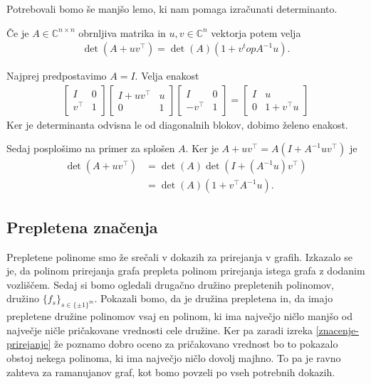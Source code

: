 Potrebovali bomo še manjšo lemo, ki nam pomaga izračunati determinanto\cite{matrix-determinant-lemma}.
\begin{lema}\label{matrix-det-lemma}
    Če je \(A\in \mathbb C^{n\times n}\) obrnljiva matrika in \(u, v \in \mathbb C^n\) vektorja potem velja
    \begin{align*}
        \det(A + uv^\top) = \det(A) (1 + v^top A^{-1} u).
    \end{align*}
\end{lema}
\begin{dokaz}
    Najprej predpostavimo \(A=I\). Velja enakost
    \begin{align*}
        \begin{bmatrix}
            I & 0 \\
            v^\top & 1
        \end{bmatrix}
        \begin{bmatrix}
            I + uv^\top & u \\
            0 & 1
        \end{bmatrix}
        \begin{bmatrix}
            I & 0 \\
            -v^\top & 1
        \end{bmatrix}
        =
        \begin{bmatrix}
            I & u \\
            0 & 1 + v^\top u
        \end{bmatrix}
    \end{align*}
    Ker je determinanta odvisna le od diagonalnih blokov, dobimo želeno enakost.

    Sedaj posplošimo na primer za splošen \(A\). Ker je \(A+uv^\top= A(I + A^{-1}uv^\top)\) je
    \begin{align*}
        \det(A + uv^\top) &= \det(A) \det(I + (A^{-1}u)v^\top)\\
         &= \det(A) (1 + v^\top A^{-1} u).
    \end{align*}
\end{dokaz}

\subsection{Prepletena značenja}
Prepletene polinome smo že srečali v dokazih za prirejanja v grafih. Izkazalo se je, da polinom prirejanja grafa prepleta polinom prirejanja istega grafa z dodanim vozliščem. Sedaj si bomo ogledali drugačno družino prepletenih polinomov, družino \(\{f_s\}_{s\in \{\pm 1\}^m}\). Pokazali bomo, da je družina prepletena in, da imajo prepletene družine polinomov vsaj en polinom, ki ima največjo ničlo manjšo od največje ničle pričakovane vrednosti cele družine. Ker pa zaradi izreka \ref{znacenje-prirejanje} že poznamo dobro oceno za pričakovano vrednost bo to pokazalo obstoj nekega polinoma, ki ima največjo ničlo dovolj majhno. To pa je ravno zahteva za ramanujanov graf, kot bomo povzeli po vseh potrebnih dokazih.

